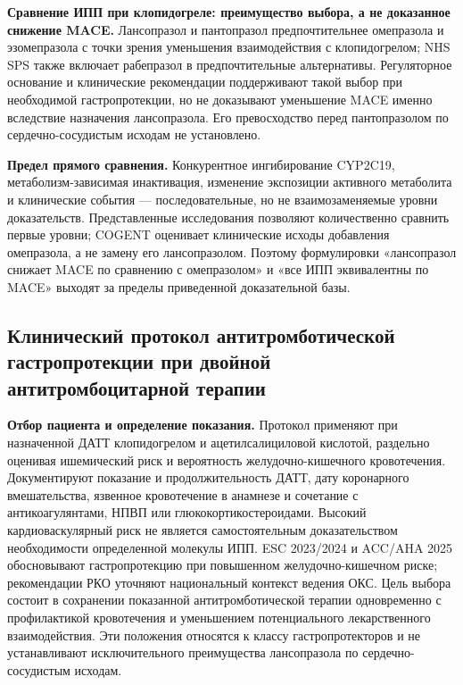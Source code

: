 \documentclass[11pt,a4paper,notitlepage]{report}
\newcommand{\src}[1]{\unskip\space\cite{#1}}
\begin{document}
\textbf{Сравнение ИПП при клопидогреле: преимущество выбора, а не доказанное снижение MACE.} Лансопразол и пантопразол предпочтительнее омепразола и эзомепразола с точки зрения уменьшения взаимодействия с клопидогрелом; NHS SPS также включает рабепразол в предпочтительные альтернативы. Регуляторное основание и клинические рекомендации поддерживают такой выбор при необходимой гастропротекции, но не доказывают уменьшение MACE именно вследствие назначения лансопразола. Его превосходство перед пантопразолом по сердечно-сосудистым исходам не установлено.\src{cardioplavix2025,sps,cardioesc2024}

\textbf{Предел прямого сравнения.} Конкурентное ингибирование CYP2C19, метаболизм-зависимая инактивация, изменение экспозиции активного метаболита и клинические события --- последовательные, но не взаимозаменяемые уровни доказательств. Представленные исследования позволяют количественно сравнить первые уровни; COGENT оценивает клинические исходы добавления омепразола, а не замену его лансопразолом. Поэтому формулировки «лансопразол снижает MACE по сравнению с омепразолом» и «все ИПП эквивалентны по MACE» выходят за пределы приведенной доказательной базы.\src{cardioli2004,cardioogilvie2011,cardiofrelinger2012,cardiocogent2010}

\subsection{Клинический протокол антитромботической гастропротекции при двойной антитромбоцитарной терапии}
\label{sec:dapt-protocol}
\textbf{Отбор пациента и определение показания.} Протокол применяют при назначенной ДАТТ клопидогрелом и ацетилсалициловой кислотой, раздельно оценивая ишемический риск и вероятность желудочно-кишечного кровотечения. Документируют показание и продолжительность ДАТТ, дату коронарного вмешательства, язвенное кровотечение в анамнезе и сочетание с антикоагулянтами, НПВП или глюкокортикостероидами. Высокий кардиоваскулярный риск не является самостоятельным доказательством необходимости определенной молекулы ИПП. ESC 2023/2024 и ACC/AHA 2025 обосновывают гастропротекцию при повышенном желудочно-кишечном риске; рекомендации РКО уточняют национальный контекст ведения ОКС. Цель выбора состоит в сохранении показанной антитромботической терапии одновременно с профилактикой кровотечения и уменьшением потенциального лекарственного взаимодействия. Эти положения относятся к классу гастропротекторов и не устанавливают исключительного преимущества лансопразола по сердечно-сосудистым исходам.\src{cardioesc2023,cardioesc2024,cardioacc2025,cardiorko2024}
\end{document}
